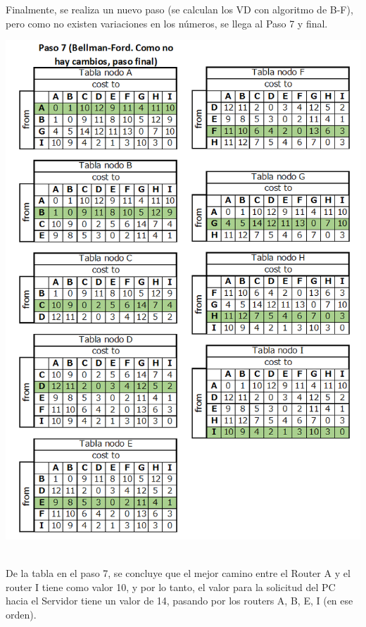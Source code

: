 \documentclass{article}
\begin{document}
Finalmente, se realiza un nuevo paso (se calculan los VD con algoritmo de B-F), pero como no existen variaciones en los números, se llega al Paso 7 y final.\\
\centerline{\includegraphics[scale=0.5]{Img/paso7.png}}\\
De la tabla en el paso 7, se concluye que el mejor camino entre el Router A y el router I tiene como valor 10, y por lo tanto, el valor para la solicitud del PC hacia el Servidor tiene un valor de 14, pasando por los routers A, B, E, I (en ese orden).
\end{document}
